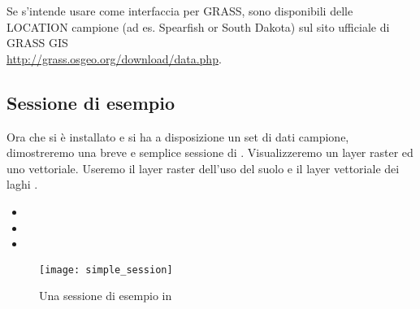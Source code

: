 Se s'intende usare \qg come interfaccia per GRASS, sono disponibili delle LOCATION
campione (ad es. Spearfish or South Dakota) sul sito ufficiale
di GRASS GIS  \\
\url{http://grass.osgeo.org/download/data.php}.

\subsection{Sessione di esempio}\label{samplesession}

Ora che si è installato \qg e si ha a disposizione un set di dati
campione, dimostreremo una breve e semplice sessione di \qg. Visualizzeremo
un layer raster ed uno vettoriale. Useremo il layer raster dell'uso
del suolo  e
il layer vettoriale dei laghi .


\begin{itemize}[label=--]
\item {} 
\item {} 
\item {}
\end{itemize} 

\begin{figure}[ht]
   \centering 
   \texttt{[image: simple\_session]}
   \caption{Una sessione di esempio in \qg \nixcaption}\label{fig:simple_session}
\end{figure}


